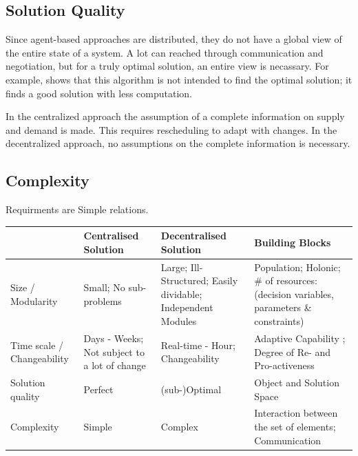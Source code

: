 \subsection{Solution Quality}
Since agent-based approaches are distributed, they do not have a global view of the entire state of a system. A lot can reached through communication and negotiation, but for a truly optimal solution, an entire view is necassary. For example,  \citep{palmer2003decentralized} shows that this algorithm is not intended to find the optimal solution; it finds a good solution with less computation. 

In the centralized approach the assumption of a complete information on supply and demand is made. This requires rescheduling to adapt with changes. In the decentralized approach, no assumptions on the complete information is necessary. 


\subsection{Complexity}
Requirments are Simple relations. %



\begin{tabular}{p{2cm}|p{3cm}|p{3cm}|p{3cm}}
	& Centralised Solution & Decentralised Solution & Building Blocks\\
	\hline \hline
	Size / Modularity & Small; No sub-problems & Large; Ill-Structured; Easily dividable; Independent Modules & Population; Holonic; \# of resources: (decision variables, parameters \& constraints)\\
	\hline
	Time scale / Changeability & Days - Weeks; Not subject to a lot of change & Real-time - Hour; Changeability  & Adaptive Capability ; Degree of Re- and Pro-activeness\\
	\hline
	Solution quality & Perfect & (sub-)Optimal & Object and Solution Space\\
	\hline
	Complexity & Simple & Complex & Interaction between the set of elements; Communication
\end{tabular}

